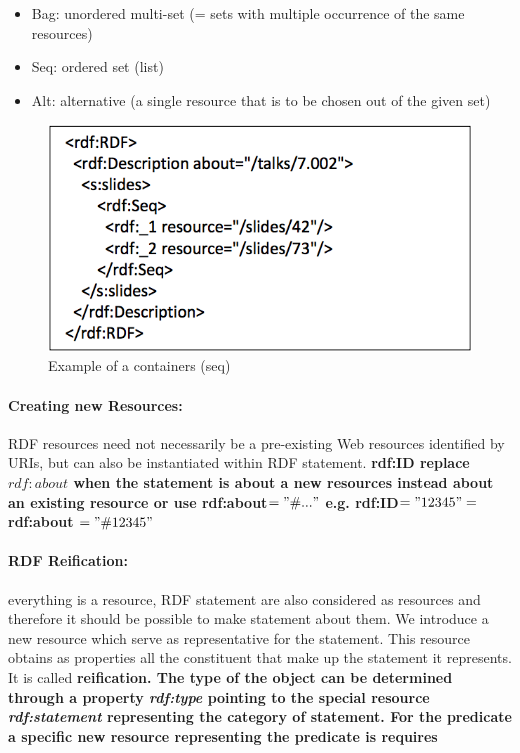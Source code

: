 \begin{itemize}
\item Bag: unordered multi-set (= sets with multiple occurrence of the same resources)
\item Seq: ordered set (list)
\item Alt: alternative (a single resource that is to be chosen out of the given set)
\end{itemize}

\begin{figure}[H]
\begin{center}
\includegraphics[width=\textwidth]{figures/container.png}
\end{center}
\caption{Example of a containers (seq)}
\end{figure}

\paragraph{Creating new Resources:} RDF resources need not necessarily be a pre-existing Web resources identified by URIs, but can also be instantiated within RDF statement. \bf{rdf:ID} replace $rdf:about$ when the statement is about a new resources instead about an existing resource or use rdf:about$="\#..."$ e.g. rdf:ID$="12345" = $rdf:about $="\#12345"$

\paragraph{RDF Reification:} everything is a resource, RDF statement are also considered as resources and therefore it should be possible to make statement about them. We introduce a new resource which serve as representative for the statement. This resource obtains as properties all the constituent that make up the statement it represents. It is called \bf{reification}. The type of the object can be determined through a property \textit{rdf:type} pointing to the special resource \textit{rdf:statement} representing the category of statement. For the predicate a specific new resource representing the predicate is requires

